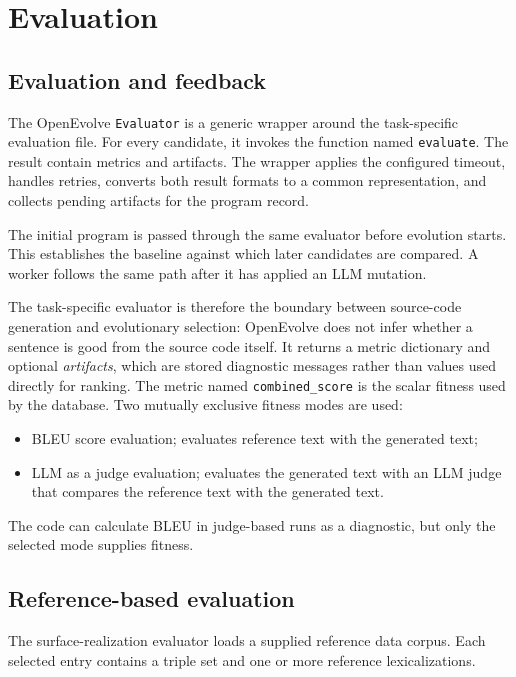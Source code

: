 \section{Evaluation}
\label{sec:surface-evaluation}

\subsection{Evaluation and feedback}

The OpenEvolve \texttt{Evaluator} is a generic wrapper around the task-specific
evaluation file. For every candidate, it invokes the function named \texttt{evaluate}. The result contain metrics and
artifacts. The wrapper applies the configured timeout, handles
retries, converts both result formats to a common representation, and collects
pending artifacts for the program record.

The initial program is passed through the same evaluator before evolution
starts. This establishes the baseline against which later candidates are
compared. A worker follows the same path after it has applied an LLM mutation.

The task-specific evaluator is therefore the boundary between source-code
generation and evolutionary selection: OpenEvolve does not infer whether a
sentence is good from the source code itself. It returns a metric dictionary and optional \emph{artifacts}, which
are stored diagnostic messages rather than values used directly for ranking.
The metric named \texttt{combined\_score} is the scalar fitness used by the
database. Two mutually exclusive fitness modes are used:

\begin{itemize}
  \item BLEU score evaluation; evaluates reference text with the generated text;
  \item LLM as a judge evaluation; evaluates the generated text with an LLM judge that compares the reference text with the generated text.
\end{itemize}

The code can calculate BLEU in judge-based runs as a diagnostic, but only the
selected mode supplies fitness.

\subsection{Reference-based evaluation}

The surface-realization evaluator loads a supplied reference data corpus.
Each selected entry contains a triple set and one or more reference
lexicalizations.

